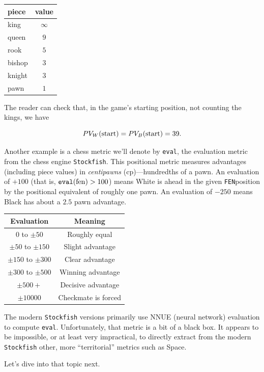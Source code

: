 \documentclass[12pt]{book}
\newcommand{\FEN}{\texttt{FEN}}
\begin{document}
\begin{center}
\begin{tabular}{lc}
piece & value \\ \hline
king & $\infty$ \\
queen & $9$ \\
rook & $5$ \\
bishop & $3$ \\
knight & $3$ \\
pawn & $1$ \\ \hline
\end{tabular}
\end{center}

\noindent
The reader can check that, in the game's starting position,
not counting the kings, we have

\[
PV_W({\rm start}) = PV_B({\rm start}) = 39.
\]

Another example is a chess metric we'll denote
by {\tt eval}, the evaluation metric from
the chess engine {\tt Stockfish}.
This positional metric measures advantages (including piece values) in
{\it centipawns} (cp)---hundredths of a pawn.
An evaluation of $+100$ (that is, ${\tt eval}({\rm fen})>100$)
means White is ahead in the given \FEN position
by the positional equivalent of roughly one pawn. An evaluation of
$-250$ means Black has about a $2.5$ pawn advantage.

\begin{center}
\begin{tabular}{|c|c|}
Evaluation & Meaning \\ \hline
 $0$ to $\pm 50$ & Roughly equal \\
 $\pm 50$ to $\pm 150$ & Slight advantage \\
 $\pm 150$ to $\pm 300$ & Clear advantage \\
 $\pm 300$ to $\pm 500$ & Winning advantage \\
 $\pm 500+$ & Decisive advantage \\
$\pm 10000$ & Checkmate is forced \\
\end{tabular}
\end{center}

The modern {\tt Stockfish} versions primarily use NNUE (neural network)
evaluation to compute {\tt eval}. Unfortunately, that metric is a bit of
a black box. It appears to be impossible, or at least very impractical, to
directly extract from the modern {\tt Stockfish} other,
more ``territorial'' metrics such as Space.

Let's dive into that topic next.
\end{document}
